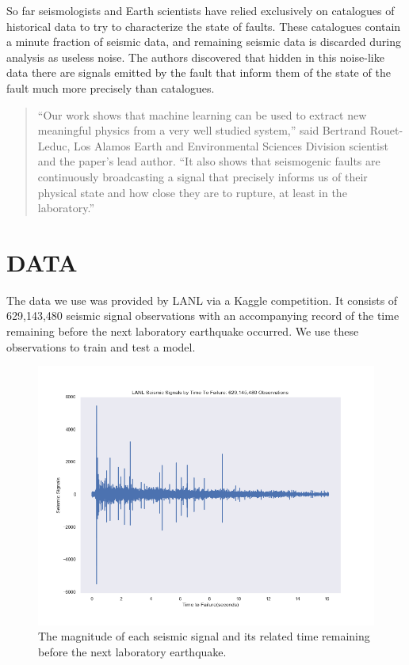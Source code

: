 \documentclass[]{llncs}
\begin{document}
So far seismologists and Earth scientists have relied exclusively on catalogues of historical data to try to characterize the state of faults. These catalogues contain a minute fraction of seismic data, and remaining seismic data is discarded during analysis as useless noise. The authors discovered that hidden in this noise-like data there are signals emitted by the fault that inform them of the state of the fault much more precisely than catalogues.\cite{LANLNews}\par
\begin{quote}
“Our work shows that machine learning can be used to extract new meaningful physics from a very well studied system,” said Bertrand Rouet-Leduc, Los Alamos Earth and Environmental Sciences Division scientist and the paper’s lead author. “It also shows that seismogenic faults are continuously broadcasting a signal that precisely informs us of their physical state and how close they are to rupture, at least in the laboratory.”
\end{quote}

\section{DATA} The data we use was provided by LANL via a Kaggle competition\cite{kaggle}. It consists of 629,143,480 seismic signal observations with an accompanying record of the time remaining before the next laboratory earthquake occurred. We use these observations to train and test a model.\par
\begin{figure}[h]
	\centering
	\includegraphics[width=0.7\linewidth]{../GPUProject/allDataDefaultPlot}
	\caption{The magnitude of each seismic signal and its related time remaining before the next laboratory earthquake.}
	\label{fig:alldatadefaultplot}
\end{figure}
\end{document}
